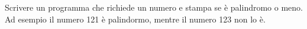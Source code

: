 \begin{Exercise}[label={ex:palindromo}]
  Scrivere un programma che richiede un numero e stampa se è palindromo o meno. Ad esempio il numero 121 è palindormo, mentre il numero 123 non lo è.
\end{Exercise}

\begin{Answer}[ref={ex:palindromo}]
  
\end{Answer}